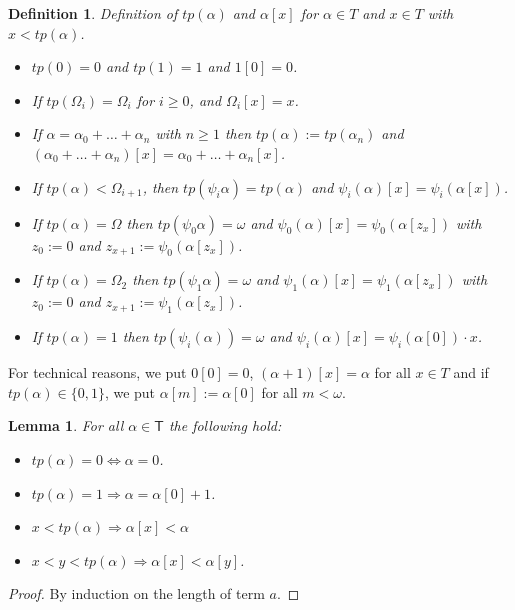 \documentclass{amsart}
\theoremstyle{plain}
\theoremstyle{plain}
\newtheorem{lemma}[theorem]{Lemma}
\newtheorem*{definition}{Definition}
\newcommand\T{\mathsf{T}}
\newcommand{\Om}{{\Omega}}
\newcommand{\al}{{\alpha}}
\newcommand{\om}{\omega}
\begin{document}
\begin{definition} \label{def:FundamentalSeq} Definition of $tp(\al)$ and $\al[x]$ for $\al\in T$ and $x\in T$ with $x<tp(\al)$.
    \begin{itemize}
        \item $tp(0)=0$ and $tp(1)=1$ and $1[0]=0$.
        \item If $tp(\Om_i)=\Om_i$  for $i\geq 0$, and $\Om_i[x]=x$.
        
        \item If $\al =\al_0+\ldots +\al_n$ with $n\geq 1$ then $tp(\al):=tp(\al_n)$ and $(\al_0+\ldots +\al_n)[x] = \al_0+\ldots +\al_n[x]$.
        
        \item  If $tp(\al) < \Om_{i+1}$, then  $tp(\psi_i\al)= tp(\al)$ and $\psi_i(\al)[x]=\psi_i(\al[x])$.
        
        \item If $tp(\al) = \Om$ then  $tp(\psi_0\al)=\om$ and $\psi_0(\al)[x]=\psi_0(\al[{z_x}])$
        with $z_0:=0$ and $z_{x+1}:=\psi_0(\al[z_x])$.
        
        \item If $tp(\al) = \Om_2$ then  $tp(\psi_1\al)=\om$ and $\psi_1(\al)[x]=\psi_1(\al[{z_x}])$
        with $z_0:=0$ and $z_{x+1}:=\psi_1(\al[z_x])$.
        
        \item If $tp(\al) =1$ then $tp(\psi_i(\al))=\om$ and $\psi_i(\al)[x]= \psi_i(\al[0])\cdot x$.
    \end{itemize}
\end{definition}
For technical reasons, we put $0[0]=0$, $(\al+1)[x] =\al$ for all $x\in T$ and if $tp(\al)\in\{0,1\}$, we put $\al[m]:=\al[0]$ for all $m<\om$. 

\begin{lemma} For all $\alpha \in \T$ the following hold:
\begin{itemize}
    \item $tp(\al) =0 \Longleftrightarrow \al=0$.
    \item $tp(\al)=1 \Longrightarrow \al =\al[0]+1$.
    \item $x<tp(\al) \Rightarrow \al[x]<\al$
    \item $x<y <tp(\al) \Rightarrow \al[x]<\al[y]$.
\end{itemize}\smallskip
\end{lemma}
\begin{proof}
    By induction on the length of term $a$.
\end{proof}
\end{document}
